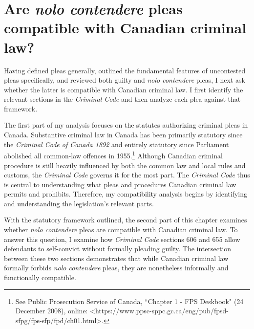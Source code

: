 \chapter{Are \textit{nolo contendere} pleas compatible with Canadian criminal law?}

\setcounter{footnote}{96}

Having defined pleas generally, outlined the fundamental features of uncontested pleas specifically, and reviewed both guilty and \textit{nolo contendere} pleas, I next ask whether the latter is compatible with Canadian criminal law. I first identify the relevant sections in the \textit{Criminal Code} and then analyze each plea against that framework. 

The first part of my analysis focuses on the statutes authorizing criminal pleas in Canada. Substantive criminal law in Canada has been primarily statutory since the \textit{Criminal Code of Canada 1892} and entirely statutory since Parliament abolished all common-law offences in 1955.\footnote{See Public Prosecution Service of Canada, ``Chapter 1 - FPS Deskbook" (24 December 2008), online: \textless https://www.ppsc-sppc.gc.ca/eng/pub/fpsd-sfpg/fps-sfp/fpd/ch01.html\textgreater.} Although Canadian criminal procedure is still heavily influenced by both the common law and local rules and customs, the \textit{Criminal Code} governs it for the most part. The \textit{Criminal Code} thus is central to understanding what pleas and procedures Canadian criminal law permits and prohibits. Therefore, my compatibility analysis begins by identifying and understanding the legislation's relevant parts. 

With the statutory framework outlined, the second part of this chapter examines whether \textit{nolo contendere} pleas are compatible with Canadian criminal law. To answer this question, I examine how \textit{Criminal Code} sections 606 and 655 allow defendants to self-convict without formally pleading guilty. The intersection between these two sections demonstrates that while Canadian criminal law formally forbids \textit{nolo contendere} pleas, they are nonetheless informally and functionally compatible.